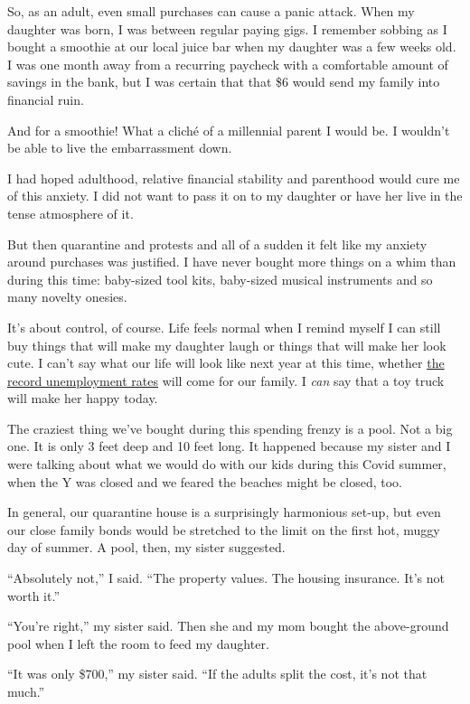 So, as an adult, even small purchases can cause a panic attack. When my
daughter was born, I was between regular paying gigs. I remember sobbing
as I bought a smoothie at our local juice bar when my daughter was a few
weeks old. I was one month away from a recurring paycheck with a
comfortable amount of savings in the bank, but I was certain that that
\$6 would send my family into financial ruin.

And for a smoothie! What a cliché of a millennial parent I would be. I
wouldn't be able to live the embarrassment down.

I had hoped adulthood, relative financial stability and parenthood would
cure me of this anxiety. I did not want to pass it on to my daughter or
have her live in the tense atmosphere of it.

But then quarantine and protests and all of a sudden it felt like my
anxiety around purchases was justified. I have never bought more things
on a whim than during this time: baby-sized tool kits, baby-sized
musical instruments and so many novelty onesies.

It's about control, of course. Life feels normal when I remind myself I
can still buy things that will make my daughter laugh or things that
will make her look cute. I can't say what our life will look like next
year at this time, whether
\href{https://www.nytimes3xbfgragh.onion/2020/05/09/business/economy/coronavirus-unemployment.html}{the
record unemployment rates} will come for our family. I \emph{can} say
that a toy truck will make her happy today.

The craziest thing we've bought during this spending frenzy is a pool.
Not a big one. It is only 3 feet deep and 10 feet long. It happened
because my sister and I were talking about what we would do with our
kids during this Covid summer, when the Y was closed and we feared the
beaches might be closed, too.

In general, our quarantine house is a surprisingly harmonious set-up,
but even our close family bonds would be stretched to the limit on the
first hot, muggy day of summer. A pool, then, my sister suggested.

``Absolutely not,'' I said. ``The property values. The housing
insurance. It's not worth it.''

``You're right,'' my sister said. Then she and my mom bought the
above-ground pool when I left the room to feed my daughter.

``It was only \$700,'' my sister said. ``If the adults split the cost,
it's not that much.''

